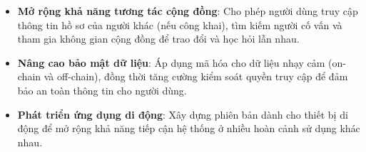 \begin{itemize}
  \item \textbf{Mở rộng khả năng tương tác cộng đồng}: Cho phép người dùng truy cập thông tin hồ sơ của người khác (nếu công khai), tìm kiếm người cố vấn và tham gia không gian cộng đồng để trao đổi và học hỏi lẫn nhau.
  \item \textbf{Nâng cao bảo mật dữ liệu}: Áp dụng mã hóa cho dữ liệu nhạy cảm (on-chain và off-chain), đồng thời tăng cường kiểm soát quyền truy cập để đảm bảo an toàn thông tin cho người dùng.
  \item \textbf{Phát triển ứng dụng di động}: Xây dựng phiên bản dành cho thiết bị di động để mở rộng khả năng tiếp cận hệ thống ở nhiều hoàn cảnh sử dụng khác nhau.
\end{itemize}